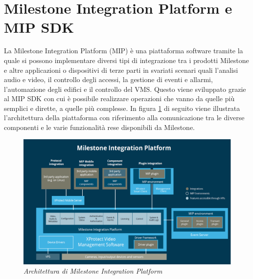 \documentclass[a4paper, openright, thesis]{report}
\begin{document}
\section{Milestone Integration Platform e MIP SDK}
La Milestone Integration Platform (MIP) è una piattaforma software tramite la quale si
possono implementare diversi tipi di integrazione tra i prodotti Milestone e altre applicazioni o
dispositivi di terze parti in svariati scenari quali l’analisi audio e video, il controllo degli
accessi, la gestione di eventi e allarmi, l’automazione degli edifici e il controllo del VMS.
Questo viene sviluppato grazie al MIP SDK con cui è possibile realizzare
operazioni che vanno da quelle più semplici e dirette, a quelle più
complesse.
In figura \ref{ex} di seguito viene illustrata l’architettura della piattaforma con riferimento alla comunicazione tra le
diverse componenti e le varie funzionalità rese disponibili da Milestone.

\begin{figure}[H]
    \centering
    \includegraphics[width=1\linewidth]{img/1.png}
    \caption{\textit{Architettura di Milestone Integration Platform}}
    \label{ex}
\end{figure}
 
\end{document}

